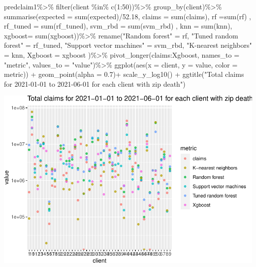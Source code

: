 \documentclass[
]{article}
\newenvironment{Shaded}{\begin{snugshade}}{\end{snugshade}}
\newcommand{\AttributeTok}[1]{\textcolor[rgb]{0.77,0.63,0.00}{#1}}
\newcommand{\DecValTok}[1]{\textcolor[rgb]{0.00,0.00,0.81}{#1}}
\newcommand{\FloatTok}[1]{\textcolor[rgb]{0.00,0.00,0.81}{#1}}
\newcommand{\FunctionTok}[1]{\textcolor[rgb]{0.00,0.00,0.00}{#1}}
\newcommand{\NormalTok}[1]{#1}
\newcommand{\OtherTok}[1]{\textcolor[rgb]{0.56,0.35,0.01}{#1}}
\newcommand{\SpecialCharTok}[1]{\textcolor[rgb]{0.00,0.00,0.00}{#1}}
\newcommand{\StringTok}[1]{\textcolor[rgb]{0.31,0.60,0.02}{#1}}
\begin{document}
\begin{Shaded}
\begin{Highlighting}[]
\NormalTok{predclaim1}\SpecialCharTok{\%\textgreater{}\%}
  \FunctionTok{filter}\NormalTok{(client }\SpecialCharTok{\%in\%} \FunctionTok{c}\NormalTok{(}\DecValTok{1}\SpecialCharTok{:}\DecValTok{50}\NormalTok{))}\SpecialCharTok{\%\textgreater{}\%}
  \FunctionTok{group\_by}\NormalTok{(client)}\SpecialCharTok{\%\textgreater{}\%}
  \FunctionTok{summarise}\NormalTok{(}\AttributeTok{expected =} \FunctionTok{sum}\NormalTok{(expected)}\SpecialCharTok{/}\FloatTok{52.18}\NormalTok{,}
        \AttributeTok{claims =} \FunctionTok{sum}\NormalTok{(claims),}
          \AttributeTok{rf =}\FunctionTok{sum}\NormalTok{(rf) ,}
         \AttributeTok{rf\_tuned =} \FunctionTok{sum}\NormalTok{(rf\_tuned),}
         \AttributeTok{svm\_rbd =} \FunctionTok{sum}\NormalTok{(svm\_rbd) ,}
         \AttributeTok{knn =} \FunctionTok{sum}\NormalTok{(knn),}
         \AttributeTok{xgboost=} \FunctionTok{sum}\NormalTok{(xgboost))}\SpecialCharTok{\%\textgreater{}\%}
  \FunctionTok{rename}\NormalTok{(}\StringTok{"Random forest"} \OtherTok{=}\NormalTok{ rf, }\StringTok{"Tuned random forest"} \OtherTok{=}\NormalTok{ rf\_tuned, }
    \StringTok{"Support vector machines"} \OtherTok{=}\NormalTok{ svm\_rbd, }\StringTok{"K{-}nearest neighbors"} \OtherTok{=}\NormalTok{ knn, }\AttributeTok{Xgboost =}\NormalTok{ xgboost )}\SpecialCharTok{\%\textgreater{}\%}
  \FunctionTok{pivot\_longer}\NormalTok{(claims}\SpecialCharTok{:}\NormalTok{Xgboost, }\AttributeTok{names\_to =} \StringTok{"metric"}\NormalTok{, }\AttributeTok{values\_to =} \StringTok{"value"}\NormalTok{)}\SpecialCharTok{\%\textgreater{}\%}
  \FunctionTok{ggplot}\NormalTok{(}\FunctionTok{aes}\NormalTok{(}\AttributeTok{x =}\NormalTok{ client, }\AttributeTok{y =}\NormalTok{ value, }\AttributeTok{color =}\NormalTok{ metric)) }\SpecialCharTok{+} \FunctionTok{geom\_point}\NormalTok{(}\AttributeTok{alpha =} \FloatTok{0.7}\NormalTok{)}\SpecialCharTok{+}
  \FunctionTok{scale\_y\_log10}\NormalTok{() }\SpecialCharTok{+}
  \FunctionTok{ggtitle}\NormalTok{(}\StringTok{"Total claims for 2021{-}01{-}01 to 2021{-}06{-}01 for each client with zip death"}\NormalTok{)}
\end{Highlighting}
\end{Shaded}

\includegraphics{figures/report/fig-unnamed-chunk-87-2.pdf}
\end{document}
